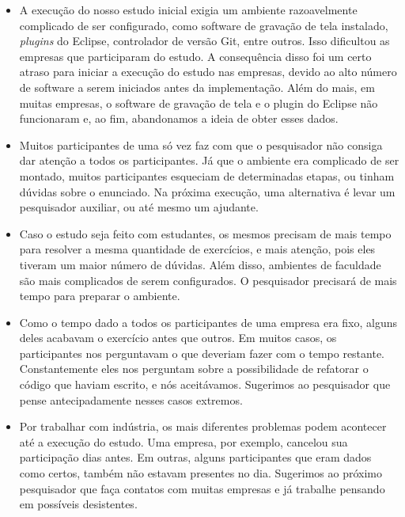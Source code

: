 \begin{itemize}
	
	\item A execução do nosso estudo inicial exigia um ambiente razoavelmente
	complicado de ser configurado, como software de gravação de tela instalado, \textit{plugins} do Eclipse,
	controlador de versão Git, entre outros. Isso dificultou as empresas que participaram
	do estudo. A consequência disso foi um certo atraso para iniciar a execução do estudo nas empresas, 
	devido ao alto número de software a serem iniciados antes da implementação. Além do mais, em muitas empresas,
	o software de gravação de tela e o plugin do Eclipse não funcionaram e, ao fim, abandonamos a ideia de
	obter esses dados.
	
	\item Muitos participantes de uma só vez faz com que o pesquisador não consiga dar atenção
	a todos os participantes. Já que o ambiente era complicado de ser montado, muitos participantes
	esqueciam de determinadas etapas, ou tinham dúvidas sobre o enunciado. Na próxima execução,
	uma alternativa é levar um pesquisador auxiliar, ou até mesmo um ajudante.
	
	\item Caso o estudo seja feito com estudantes, os mesmos precisam de mais tempo para resolver
	a mesma quantidade de exercícios, e mais atenção, pois eles tiveram um maior número
	de dúvidas. Além disso, ambientes de faculdade são mais complicados de serem configurados.
	O pesquisador precisará de mais tempo para preparar o ambiente.
	
	\item Como o tempo dado a todos os participantes de uma empresa era fixo, alguns deles
	acabavam o exercício antes que outros. Em muitos casos, os participantes nos perguntavam
	o que deveriam fazer com o tempo restante. Constantemente eles nos perguntam sobre a possibilidade
	de refatorar o código que haviam escrito, e nós aceitávamos. Sugerimos
	ao pesquisador que pense antecipadamente nesses casos extremos.
	
	\item Por trabalhar com indústria, os mais diferentes problemas podem acontecer 
	até a execução do estudo. Uma empresa, por exemplo, cancelou sua participação
	dias antes. Em outras, alguns participantes que eram dados como certos, também
	não estavam presentes no dia. Sugerimos ao próximo pesquisador que faça contatos
	com muitas empresas e já trabalhe pensando em possíveis desistentes.
	

\end{itemize}
